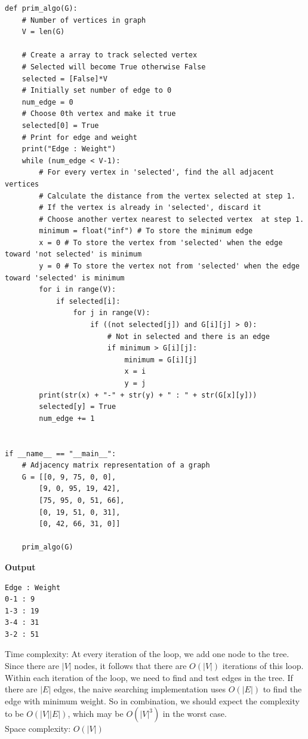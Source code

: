 \documentclass[a4paper,11pt]{book}
\begin{document}
\begin{lstlisting}
def prim_algo(G):
    # Number of vertices in graph
    V = len(G)

    # Create a array to track selected vertex
    # Selected will become True otherwise False
    selected = [False]*V
    # Initially set number of edge to 0
    num_edge = 0
    # Choose 0th vertex and make it true
    selected[0] = True
    # Print for edge and weight
    print("Edge : Weight")
    while (num_edge < V-1):
        # For every vertex in 'selected', find the all adjacent vertices
        # Calculate the distance from the vertex selected at step 1.
        # If the vertex is already in 'selected', discard it
        # Choose another vertex nearest to selected vertex  at step 1.
        minimum = float("inf") # To store the minimum edge
        x = 0 # To store the vertex from 'selected' when the edge toward 'not selected' is minimum
        y = 0 # To store the vertex not from 'selected' when the edge toward 'selected' is minimum
        for i in range(V):
            if selected[i]:
                for j in range(V):
                    if ((not selected[j]) and G[i][j] > 0):  
                        # Not in selected and there is an edge
                        if minimum > G[i][j]:
                            minimum = G[i][j]
                            x = i
                            y = j
        print(str(x) + "-" + str(y) + " : " + str(G[x][y]))
        selected[y] = True
        num_edge += 1


if __name__ == "__main__":
    # Adjacency matrix representation of a graph
    G = [[0, 9, 75, 0, 0],
        [9, 0, 95, 19, 42],
        [75, 95, 0, 51, 66],
        [0, 19, 51, 0, 31],
        [0, 42, 66, 31, 0]]

    prim_algo(G)
\end{lstlisting}
\textbf{Output}
\begin{lstlisting}
Edge : Weight
0-1 : 9
1-3 : 19
3-4 : 31
3-2 : 51
\end{lstlisting}

\noindent Time complexity: At every iteration of the loop, we add one node to the tree. Since there are $|V|$ nodes, it follows that there are $O(|V|)$ iterations of this loop. Within each iteration of the loop, we need to find and test edges in the tree. If there are $|E|$ edges, the naive searching implementation uses $O(|E|)$ to find the edge with minimum weight. So in combination, we should expect the complexity to be $O(|V||E|)$, which may be $O(|V|^3)$ in the worst case.\\
Space complexity: $O(|V|)$
\end{document}
